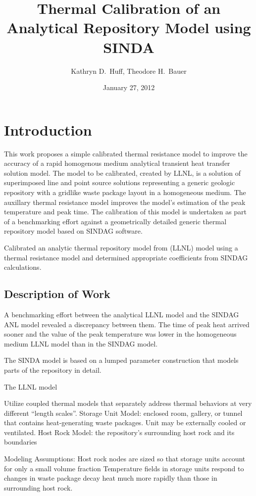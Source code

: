 \documentclass{anstrans}
\title{Thermal Calibration of an Analytical Repository Model using SINDA}
\author{Kathryn D.~Huff, Theodore H.~Bauer}
\institute{Department of Nuclear Engineering \& Engineering Physics, University 
of Wisconsin, Madison, WI, 53706\\
Nuclear Engineering Division, Argonne National Laboratory, Argonne, IL, 60439}
\date{January 27, 2012}
\begin{document}
\section{Introduction}

This work proposes a simple calibrated thermal resistance model to improve the 
accuracy of a rapid homogenous medium analytical transient heat transfer 
solution model. The model to be calibrated, created by \gls{LLNL}, is a solution 
of superimposed line and point source solutions representing a generic geologic 
repository with a gridlike waste package layout in a homogeneous medium. The 
auxillary thermal resistance model improves the model's estimation of the peak 
temperature and peak time. The calibration of this model is undertaken as part 
of a benchmarking effort against a geometrically detailed generic thermal 
repository model based on \gls{SINDAG} software.

Calibrated an analytic thermal repository model from (\gls{LLNL}) model using a 
thermal resistance model and determined appropriate coefficients from 
\gls{SINDAG} calculations. 


\subsection{Description of Work}

A benchmarking effort between the analytical \gls{LLNL} model and the 
\gls{SINDAG} \gls{ANL} model revealed a discrepancy between them. The time of 
peak heat arrived sooner and the value of the peak temperature was lower in the 
homogeneous medium \gls{LLNL} model than in the \gls{SINDAG} model. 

The SINDA model is based on a lumped parameter construction that models parts of 
the repository in detail. 

The LLNL model

Utilize coupled thermal models that separately address thermal behaviors at very 
different “length scales”.
Storage Unit Model: enclosed room, gallery, or tunnel that contains 
heat-generating waste packages.  Unit may be externally cooled or ventilated.
Host Rock Model: the repository’s surrounding host rock and its boundaries

Modeling Assumptions:
Host rock nodes are sized so that storage units account for only a small volume 
fraction
Temperature fields in storage units respond to changes in waste package decay 
heat much more rapidly than those in surrounding host rock. 
\end{document}
